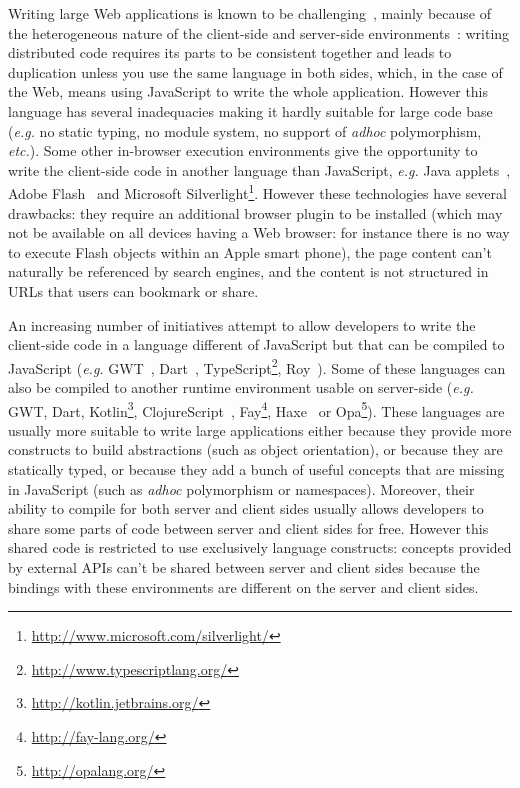 \documentclass[american,english,runningheads]{llncs}
\newcommand{\eg}{\emph{e.g.}}
\newcommand{\etc}{\emph{etc.}}
\begin{document}
Writing large Web applications is known to be challenging~\cite{Mikkonen08_SpaghettiJs,Preciado05_RIAMethodologyNecessity}, mainly because of the heterogeneous nature of the client-side and server-side environments~\cite{Echeverria09_RIA,Kuuskeri09_PartitioningClientServer}: writing distributed code requires its parts to be consistent together and leads to duplication unless you use the same language in both sides, which, in the case of the Web, means using JavaScript to write the whole application. However this language has several inadequacies making it hardly suitable for large code base (\eg{} no static typing, no module system, no support of \emph{adhoc} polymorphism, \etc). Some other in-browser execution environments give the opportunity to write the client-side code in another language than JavaScript, \eg{} Java applets~\cite{Anuff96_JavaApplets}, Adobe Flash~\cite{Curtis00_Flash} and Microsoft Silverlight\footnote{\href{http://www.microsoft.com/silverlight/}{http://www.microsoft.com/silverlight/}}. However these technologies have several drawbacks: they require an additional browser plugin to be installed (which may not be available on all devices having a Web browser: for instance there is no way to execute Flash objects within an Apple smart phone), the page content can't naturally be referenced by search engines, and the content is not structured in URLs that users can bookmark or share.

An increasing number of initiatives attempt to allow developers to write the client-side code in a language different of JavaScript but that can be compiled to JavaScript (\eg{} GWT~\cite{Chaganti07_GWT}, Dart~\cite{Griffith11_Dart}, TypeScript\footnote{\href{http://www.typescriptlang.org/}{http://www.typescriptlang.org/}}, Roy~\cite{McKenna_Roy}). Some of these languages can also be compiled to another runtime environment usable on server-side (\eg{} GWT, Dart, Kotlin\footnote{\href{http://kotlin.jetbrains.org/}{http://kotlin.jetbrains.org/}}, ClojureScript~\cite{McGranaghan11_ClojureScript}, Fay\footnote{\href{http://fay-lang.org/}{http://fay-lang.org/}}, Haxe~\cite{Cannasse08_HaXe} or Opa\footnote{\href{http://opalang.org/}{http://opalang.org/}}). These languages are usually more suitable to write large applications either because they provide more constructs to build abstractions (such as object orientation), or because they are statically typed, or because they add a bunch of useful concepts that are missing in JavaScript (such as \emph{adhoc} polymorphism or namespaces). Moreover, their ability to compile for both server and client sides usually allows developers to share some parts of code between server and client sides for free. However this shared code is restricted to use exclusively language constructs: concepts provided by external APIs can't be shared between server and client sides because the bindings with these environments are different on the server and client sides.
\end{document}
